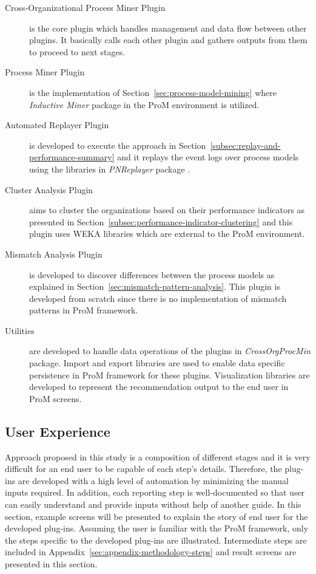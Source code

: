 \begin{description}
  \item[Cross-Organizational Process Miner Plugin] is the core plugin which handles management and data flow between other plugins. It basically calls each other plugin and gathers outputs from them to proceed to next stages. 
  \item[Process Miner Plugin] is the implementation of Section~\ref{sec:process-model-mining} where \textit{Inductive Miner} \cite{leemans2014discoveringinfrequent} package in the ProM environment is utilized. 
  \item[Automated Replayer Plugin] is developed to execute the approach in Section~\ref{subsec:replay-and-performance-summary} and it replays the event logs over process models  using the libraries in \textit{PNReplayer} package \cite{adriansyah2011towards}. 
  \item[Cluster Analysis Plugin] aims to cluster the organizations based on their performance indicators as presented in Section~\ref{subsec:performance-indicator-clustering} and this plugin uses WEKA libraries \cite{hall2009} which are external to the ProM environment. 
  \item[Mismatch Analysis Plugin] is developed to discover differences between the process models as explained in Section~\ref{sec:mismatch-pattern-analysis}. This plugin is developed from scratch since there is no implementation of mismatch patterns \cite{dijkman2007mismatch} in ProM framework.
  \item[Utilities] are developed to handle data operations of the plugins in \textit{CrossOrgProcMin} package. Import and export libraries are used to enable data specific persistence in ProM framework for these plugins. Visualization libraries are developed to represent the recommendation output to the end user in ProM screens.
\end{description}   

\subsection{User Experience}
\label{subsec:user-experience}
Approach proposed in this study is a composition of different stages and it is very difficult for an end user to be capable of each step's details. Therefore, the plug-ins are developed with a high level of automation by minimizing the manual inputs required. In addition, each reporting step is well-documented so that user can easily understand and provide inputs without help of another guide. In this section, example screens will be presented to explain the story of end user for the developed plug-ins. Assuming the user is familiar with the ProM framework, only the steps specific to the developed plug-ins are illustrated. Intermediate steps are included in Appendix~\ref{sec:appendix-methodology-steps} and result screens are presented in this section.

